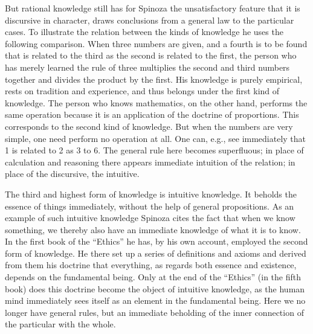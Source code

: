 \documentclass[12pt]{book}
\newcommand{\opage}[1]{\marginnote{\footnotesize\textit{[#1]}}}
\begin{document}
But rational knowledge still has for Spinoza %
the unsatisfactory feature that it is discursive in character, draws conclusions from a
general law to the particular cases. To illustrate the relation between the kinds of
knowledge he uses the following comparison. When three numbers are given, and a fourth
is to be found that is related \opage{111}to the third as the second is related to the
first, the person who has merely learned the rule of three multiplies the second and
third numbers together and divides the product by the first. His knowledge is purely
empirical, rests on tradition and experience, and thus belongs under the first kind of
knowledge. The person who knows mathematics, on the other hand, performs the same
operation because it is an application of the doctrine of proportions. This corresponds
to the second kind of knowledge. But when the numbers are very simple, one need perform
no operation at all. One can, e.g., see immediately that 1 is related to 2 as 3 to 6.
The general rule here becomes superfluous; in place of calculation and reasoning there
appears immediate intuition of the relation; in place of the discursive, the intuitive.

The third and highest form of knowledge is intuitive knowledge. It beholds the essence
of things immediately, without the help of general propositions. As an example of such
intuitive knowledge Spinoza cites the fact that when we know something, we thereby also
have an immediate knowledge of what it is to know. In the first book of the ``Ethics''
he has, by his own account, employed the second form of knowledge. He there set up a
series of definitions and axioms and derived from them his doctrine that everything,
as regards both essence and existence, depends on the fundamental being. Only at the
end of the ``Ethics'' (in the fifth book) does this doctrine become the object of
intuitive knowledge, as the human mind immediately sees itself as an element in the
fundamental being. Here we no longer have general rules, but an \opage{112}immediate
beholding of the inner connection of the particular with the whole.
\end{document}
